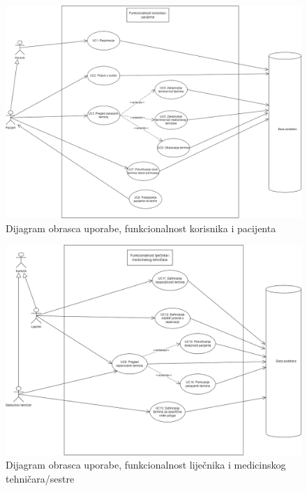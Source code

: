 				
					\begin{figure}[H]
			            \includegraphics[width=\textwidth]{slike/pacijent_usecase.png} %
			            \caption{Dijagram obrasca uporabe, funkcionalnost korisnika i pacijenta}
			            \label{fig:promjene2} %
		            \end{figure}
				
				    \begin{figure}[H]
			            \includegraphics[width=\textwidth]{slike/lijecnik_tehn_usecase.png} %
			            \caption{Dijagram obrasca uporabe, funkcionalnost liječnika i medicinskog tehničara/sestre}
			            \label{fig:promjene2} %
		            \end{figure}
				
